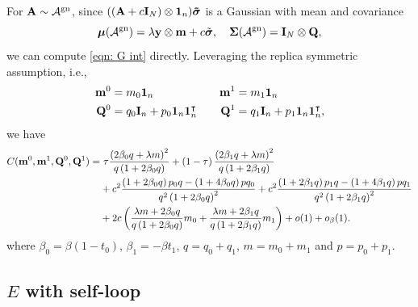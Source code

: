 \documentclass[9pt,twocolumn]{pnas-new}
\begin{document}
For $\mathbf{A} \sim \mathcal{A}^{\text{gn}}$, since $((\mathbf{A}+c\mathbf{I}_N)\otimes \bm{1}_n)\boldsymbol{\Tilde{\sigma}}$ is a Gaussian with mean and covariance 
\begin{equation*}
    \boldsymbol{\mu}(\mathcal{A}^{\text{gn}})=\lambda \mathbf{y}\otimes \mathbf{m}+c\Tilde{\boldsymbol{\sigma}}, \quad \boldsymbol{\Sigma}(\mathcal{A}^{\text{gn}})=\mathbf{I}_{N}\otimes \mathbf{Q},
\end{equation*}we can compute \eqref{eqn: G int} directly. Leveraging the replica symmetric assumption, i.e.,
\begin{equation*}
\begin{aligned}
        \mathbf{m}^0&=m_0\boldsymbol{1}_n\quad &\mathbf{m}^1&=m_1\boldsymbol{1}_n\\
        \mathbf{Q}^0&=q_0\mathbf{I}_n+ p_0 \boldsymbol{1}_n \boldsymbol{1}_n^\intercal \quad &\mathbf{Q}^1&=q_1\mathbf{I}_n+ p_1 \boldsymbol{1}_n \boldsymbol{1}_n^\intercal,\\
\end{aligned}
\end{equation*}
we have
\begin{equation*}
\begin{aligned}
   C(\mathbf{m}^0,\mathbf{m}^1,\mathbf{Q}^0,\mathbf{Q}^1) = & ~ \tau\frac{\left(2\beta_{0}q+\lambda m\right)^{2}}{q\left(1+2\beta_{0}q\right)}+\left(1-\tau\right)\frac{\left(2\beta_{1}q+\lambda m\right)^{2}}{q\left(1+2\beta_{1}q\right)}\\&+c^{2}\frac{\left(1+2\beta_{0}q\right)p_{0}q-\left(1+4\beta_{0}q\right)pq_{0}}{q^{2}\left(1+2\beta_{0}q\right)^{2}}+c^{2}\frac{\left(1+2\beta_{1}q\right)p_{1}q-\left(1+4\beta_{1}q\right)pq_{1}}{q^{2}\left(1+2\beta_{1}q\right)^{2}}\\&+2c\left(\frac{\lambda m+2\beta_{0}q}{q\left(1+2\beta_{0}q\right)}m_{0}+\frac{\lambda m+2\beta_{1}q}{q\left(1+2\beta_{1}q\right)}m_{1}\right)+o(1)+o_\beta(1).
\end{aligned}
\end{equation*}
where $\beta_0=\beta(1-t_0)$, $\beta_1=-\beta t_1$, $q=q_0+q_1$, $m=m_0+m_1$ and $p=p_0+p_1$.


\subsection{$E$ with self-loop}
\end{document}
